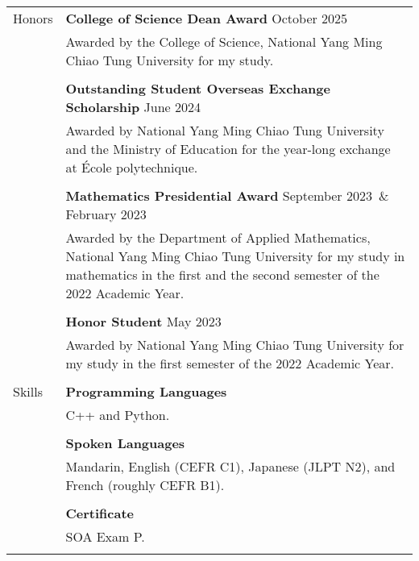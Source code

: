 \documentclass[letterpaper, 11pt]{article}
\newcommand{\spaceand}{\,\&\ \,}
\begin{document}
\begin{center}
\begin{longtable}{p{0.76in}p{5.93in}}
        {\textcolor{OliveGreen}{Honors}} & \textbf{College of Science Dean Award} \hfill October 2025\\
        & Awarded by the College of Science, National Yang Ming Chiao Tung University for my study. \\
        & \\
        & \textbf{Outstanding Student Overseas Exchange Scholarship} \hfill June 2024\\
        & Awarded by National Yang Ming Chiao Tung University and the Ministry of Education for the year-long exchange at \'Ecole polytechnique. \\
        & \\
        & \textbf{Mathematics Presidential Award} \hfill September 2023 \spaceand February 2023\\
        & Awarded by the Department of Applied Mathematics, National Yang Ming Chiao Tung University for my study in mathematics in the first and the second semester of the 2022 Academic Year.\\
        & \\
        & \textbf{Honor Student} \hfill May 2023\\
        & Awarded by National Yang Ming Chiao Tung University for my study in the first semester of the 2022 Academic Year. \\
        & \\

        
        {\textcolor{OliveGreen}{Skills}} 
        & \textbf{Programming Languages}\\
        & C++ and Python.\\
        & \\

        & \textbf{Spoken Languages} \\
        & Mandarin, English (CEFR C1), Japanese (JLPT N2), and French (roughly CEFR B1).\\
        & \\

        & \textbf{Certificate} \\
        & SOA Exam P.\\
        & \\
        

\end{longtable}
\end{center}
\end{document}

